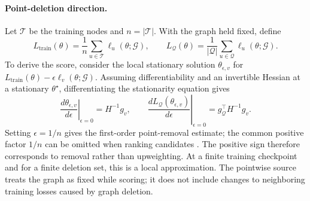 \paragraph{Point-deletion direction.}
Let $\mathcal T$ be the training nodes and $n=|\mathcal T|$. With the graph held fixed, define
\begin{equation}
L_{\mathrm{train}}(\theta)=\frac{1}{n}\sum_{u\in\mathcal T}
\ell_u(\theta;\mathcal G),
\qquad
L_{\mathcal Q}(\theta)=\frac{1}{|\mathcal Q|}
\sum_{u\in\mathcal Q}\ell_u(\theta;\mathcal G).
\end{equation}
To derive the score, consider the local stationary solution $\theta_{\epsilon,v}$ for
$L_{\mathrm{train}}(\theta)-\epsilon\ell_v(\theta;\mathcal G)$.
Assuming differentiability and an invertible Hessian at a stationary $\theta^\star$, differentiating the stationarity equation gives
\begin{equation}
\left.\frac{d\theta_{\epsilon,v}}{d\epsilon}\right|_{\epsilon=0}
=H^{-1}g_v,
\qquad
\left.\frac{dL_{\mathcal Q}(\theta_{\epsilon,v})}{d\epsilon}\right|_{\epsilon=0}
=g_{\mathcal Q}^{\top}H^{-1}g_v.
\label{eq:if-derivation}
\end{equation}
Setting $\epsilon=1/n$ gives the first-order point-removal estimate; the common positive factor $1/n$ can be omitted when ranking candidates \citep{koh2017understanding}. The positive sign therefore corresponds to removal rather than upweighting. At a finite training checkpoint and for a finite deletion set, this is a local approximation. The pointwise source treats the graph as fixed while scoring; it does not include changes to neighboring training losses caused by graph deletion.

